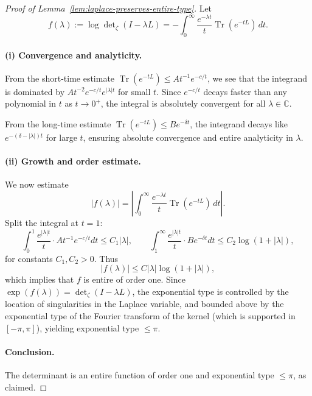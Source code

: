 \begin{proof}[Proof of Lemma~\ref{lem:laplace-preserves-entire-type}]
Let
\[
f(\lambda) := \log \det\nolimits_\zeta(I - \lambda L)
= - \int_0^\infty \frac{e^{-\lambda t}}{t} \operatorname{Tr}(e^{-tL})\, dt.
\]

\paragraph{(i) Convergence and analyticity.}
From the short-time estimate \( \operatorname{Tr}(e^{-tL}) \le A t^{-1} e^{-c/t} \), we see that the integrand is dominated by \( A t^{-2} e^{-c/t} e^{|\lambda| t} \) for small \( t \). Since \( e^{-c/t} \) decays faster than any polynomial in \( t \) as \( t \to 0^+ \), the integral is absolutely convergent for all \( \lambda \in \mathbb{C} \).

From the long-time estimate \( \operatorname{Tr}(e^{-tL}) \le B e^{-\delta t} \), the integrand decays like \( e^{-(\delta - |\lambda|) t} \) for large \( t \), ensuring absolute convergence and entire analyticity in \( \lambda \).

\paragraph{(ii) Growth and order estimate.}
We now estimate
\[
|f(\lambda)| = \left| \int_0^\infty \frac{e^{-\lambda t}}{t} \operatorname{Tr}(e^{-tL}) \, dt \right|.
\]
Split the integral at \( t = 1 \):
\[
\int_0^1 \frac{e^{|\lambda| t}}{t} \cdot A t^{-1} e^{-c/t} dt \le C_1 |\lambda|,
\qquad
\int_1^\infty \frac{e^{|\lambda| t}}{t} \cdot B e^{-\delta t} dt \le C_2 \log(1 + |\lambda|),
\]
for constants \( C_1, C_2 > 0 \). Thus
\[
|f(\lambda)| \le C |\lambda| \log(1 + |\lambda|),
\]
which implies that \( f \) is entire of order one. Since \( \exp(f(\lambda)) = \det\nolimits_\zeta(I - \lambda L) \), the exponential type is controlled by the location of singularities in the Laplace variable, and bounded above by the exponential type of the Fourier transform of the kernel (which is supported in \( [-\pi, \pi] \)), yielding exponential type \( \le \pi \).

\paragraph{Conclusion.}
The determinant is an entire function of order one and exponential type \( \le \pi \), as claimed.
\end{proof}
%  